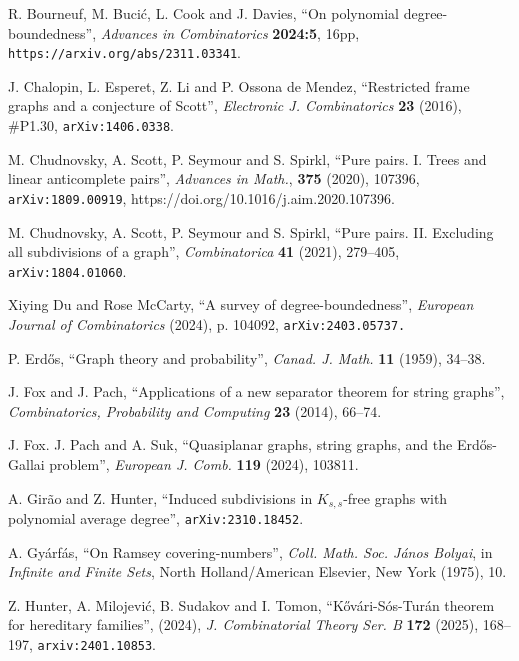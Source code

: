 \documentclass[titlepage,11pt]{article}
\begin{document}
\begin{thebibliography}{99}

R. Bourneuf, M. Buci\'c, L. Cook and J. Davies, ``On polynomial degree-boundedness'',
{\em Advances in Combinatorics} {\bf 2024:5}, 16pp,
{\tt https://arxiv.org/abs/2311.03341}.

J. Chalopin, L. Esperet, Z. Li and P. Ossona de Mendez,
``Restricted frame graphs and a conjecture of Scott'',
{\em Electronic J. Combinatorics} {\bf 23} (2016), \#P1.30,
{\tt arXiv:1406.0338}.

 M. Chudnovsky, A. Scott, P. Seymour and S. Spirkl,
``Pure pairs. I. Trees and linear anticomplete pairs'',
{\em Advances in Math.}, {\bf 375} (2020), 107396, {\tt arXiv:1809.00919},
https://doi.org/10.1016/j.aim.2020.107396.

 M. Chudnovsky, A. Scott, P. Seymour and S. Spirkl,
``Pure pairs. II. Excluding all subdivisions of a graph'',
{\em Combinatorica} {\bf 41} (2021), 279--405, {\tt arXiv:1804.01060}.

 Xiying Du and Rose McCarty, ``A survey of degree-boundedness'',
{\em European Journal of Combinatorics} (2024), p. 104092,
{\tt arXiv:2403.05737.}


 P. Erd\H{o}s,
``Graph theory and probability'',
{\em Canad. J. Math.} {\bf 11} (1959), 34--38.

J. Fox and J. Pach, ``Applications of a new separator theorem for string graphs'', {\em Combinatorics, Probability and Computing} {\bf 23} (2014), 66--74.

J. Fox. J. Pach and A. Suk, ``Quasiplanar graphs, string graphs, and the Erd\H{o}s-Gallai problem'', {\em European J. Comb.} {\bf 119} (2024),  103811.

 A. Gir\~{a}o and Z. Hunter, ``Induced subdivisions in $K_{s,s}$-free graphs with polynomial average degree'',
{\tt arXiv:2310.18452}.

A. Gy\'arf\'as, ``On Ramsey covering-numbers'',
{\em Coll. Math. Soc. J\'anos Bolyai}, in {\em Infinite and Finite Sets},
North Holland/American Elsevier, New York (1975), 10.

Z. Hunter, A. Milojevi\'{c}, B. Sudakov and I. Tomon, 
``K\H{o}v\'{a}ri-S\'{o}s-Tur\'{a}n theorem for hereditary families'', (2024),
{\em J. Combinatorial Theory Ser. B} {\bf 172} (2025), 168--197,
{\tt arxiv:2401.10853}.


\end{thebibliography}
\end{document}
